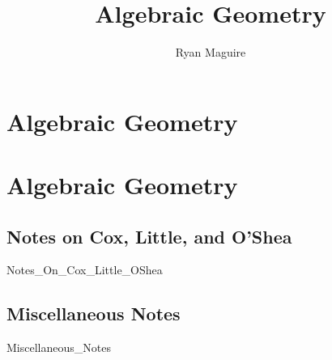 \documentclass[crop=false,class=book,oneside]{standalone}
\begin{document}
    \newif\ifmathcoursesalgebraicgeometry
    \ifx\ifmathcourses\undefined
        \title{Algebraic Geometry}
        \author{Ryan Maguire}
        \date{\vspace{-5ex}}
        \maketitle
        \tableofcontents
        \clearpage
        \chapter*{Algebraic Geometry}
        \setcounter{chapter}{1}
    \else
        \chapter{Algebraic Geometry}
    \fi
    \section{Notes on Cox, Little, and O'Shea}
        {Notes_On_Cox_Little_OShea}
    \section{Miscellaneous Notes}
        {Miscellaneous_Notes}
\end{document}
